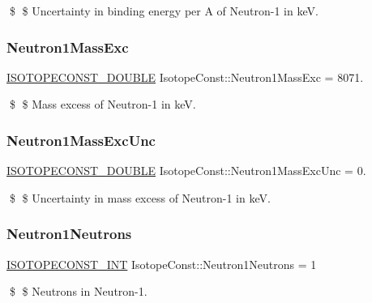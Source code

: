 \$ \$ Uncertainty in binding energy per A of Neutron-\/1 in keV. \mbox{\label{group___isotope_const-_neutron-n1_ga8e6004b0b06946670ba883f3e63ffad8}} 
\subsubsection{\texorpdfstring{Neutron1\+Mass\+Exc}{Neutron1MassExc}}
{\footnotesize\ttfamily \mbox{\hyperlink{group___isotope_const-_macros_ga8f45a7272ce02c0b4c65c44636ed719a}{I\+S\+O\+T\+O\+P\+E\+C\+O\+N\+S\+T\+\_\+\+D\+O\+U\+B\+LE}} Isotope\+Const\+::\+Neutron1\+Mass\+Exc = 8071.}

\$ \$ Mass excess of Neutron-\/1 in keV. \mbox{\label{group___isotope_const-_neutron-n1_ga838df517be679dba5d2873c5505fbd60}} 
\subsubsection{\texorpdfstring{Neutron1\+Mass\+Exc\+Unc}{Neutron1MassExcUnc}}
{\footnotesize\ttfamily \mbox{\hyperlink{group___isotope_const-_macros_ga8f45a7272ce02c0b4c65c44636ed719a}{I\+S\+O\+T\+O\+P\+E\+C\+O\+N\+S\+T\+\_\+\+D\+O\+U\+B\+LE}} Isotope\+Const\+::\+Neutron1\+Mass\+Exc\+Unc = 0.}

\$ \$ Uncertainty in mass excess of Neutron-\/1 in keV. \mbox{\label{group___isotope_const-_neutron-n1_ga22a554f59ca63213387a1108295a4fcb}} 
\subsubsection{\texorpdfstring{Neutron1\+Neutrons}{Neutron1Neutrons}}
{\footnotesize\ttfamily \mbox{\hyperlink{group___isotope_const-_macros_ga5f18360b3e99483a35c32d789e62621c}{I\+S\+O\+T\+O\+P\+E\+C\+O\+N\+S\+T\+\_\+\+I\+NT}} Isotope\+Const\+::\+Neutron1\+Neutrons = 1}

\$ \$ Neutrons in Neutron-\/1. \mbox{\label{group___isotope_const-_neutron-n1_ga8405a8e76ff070453aace58995502a28}} 
